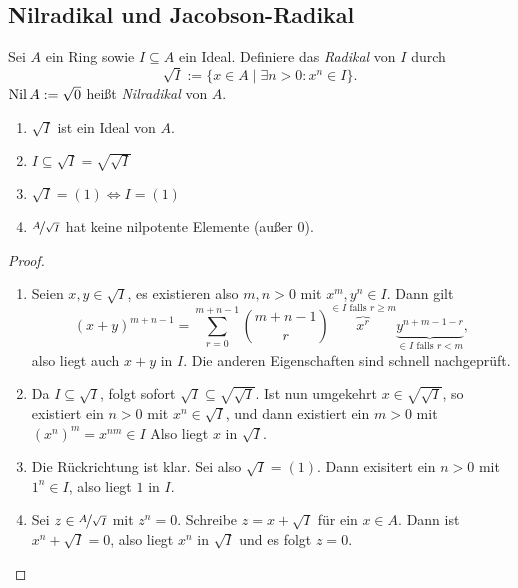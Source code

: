 \documentclass[12pt,a4paper]{scrartcl}
\theoremstyle{cplain}
\theoremstyle{cdef}
\begin{document}
\subsection{Nilradikal und Jacobson-Radikal}
\begin{defi}
    Sei $A$ ein Ring sowie $I\subseteq A$ ein Ideal. Definiere das \emph{Radikal} von $I$ durch \[\sqrt{I} := \{x\in A \mid \exists n>0: x^n\in I\}.\]
    $\operatorname{Nil} A := \sqrt{0}$ heißt \emph{Nilradikal} von $A$.
\end{defi}
\begin{lem}
    \leavevmode
    \begin{enumerate}
        \item $\sqrt{I}$ ist ein Ideal von $A$. \label{lem:radikal:i}
        \item $I\subseteq \sqrt{I} = \sqrt{\sqrt{I}}$ \label{lem:radikal:ii}
        \item $\sqrt{I} = (1) \Leftrightarrow I = (1)$ \label{lem:radikal:iii}
        \item $\nicefrac{A}{\sqrt{I}}$ hat keine nilpotente Elemente (außer 0). \label{lem:radikal:iv}
    \end{enumerate}
\end{lem}
\begin{proof}
	\leavevmode
	\begin{enumerate}[label=\ref{lem:radikal:\roman*}]
		\item Seien $x, y\in \sqrt{I}$, es existieren also $m, n > 0$ mit $x^m, y^n\in I$. Dann gilt
		\[(x+y)^{m+n-1}=\sum_{r=0}^{m+n-1}{m+n-1 \choose r}\overbrace{x^r}^{\in I \text{ falls } r\ge m}\underbrace{y^{n+m-1-r}}_{\in I \text{ falls } r<m},\]
		also liegt auch $x+y$ in $I$. Die anderen Eigenschaften sind schnell nachgeprüft.
		\item Da $I\subseteq \sqrt{I}$, folgt sofort $\sqrt{I} \subseteq \sqrt{\sqrt{I}}$. Ist nun umgekehrt $x\in \sqrt{\sqrt{I}}$, so existiert ein $n>0$ mit $x^n\in \sqrt{I}$, und dann existiert ein $m>0$ mit $(x^n)^m = x^{nm} \in I$ Also liegt $x$ in $\sqrt{I}$.
		\item Die Rückrichtung ist klar. Sei also $\sqrt I=(1)$. Dann exisitert ein $n>0$ mit $1^n \in I$, also liegt $1$ in $I$.
		\item Sei $z\in \nicefrac{A}{\sqrt{I}}$ mit $z^n=0$. Schreibe $z=x+\sqrt{I}$ für ein $x\in A$. Dann ist $x^n+\sqrt{I} = 0$, also liegt $x^n$ in $\sqrt{I}$ und es folgt $z=0$.
		\qedhere
	\end{enumerate}
\end{proof}
\end{document}

